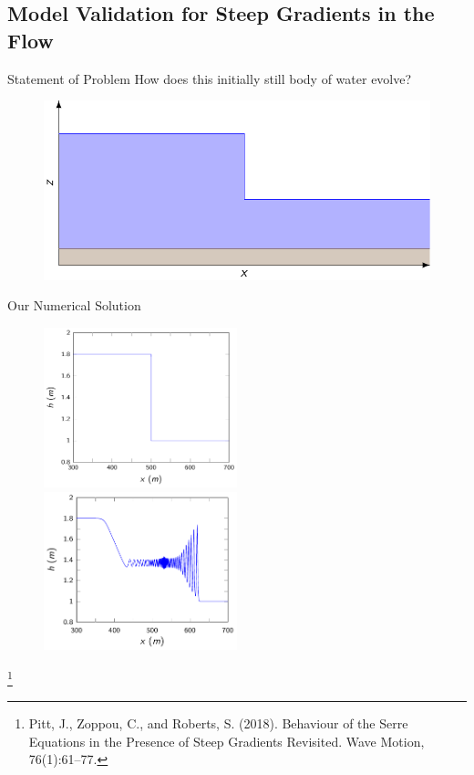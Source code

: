 \documentclass[pdf]{beamer}
\newcommand\blfootnote[1]{%
	\begingroup
	\renewcommand\thefootnote{}\footnote{#1}%
	\addtocounter{footnote}{-1}%
	\endgroup
}
\begin{document}
\subsection{ Model Validation for Steep Gradients in the Flow}
\begin{frame}{Statement of Problem}
	How does this initially still body of water evolve?
	\begin{figure}
		\includegraphics[width=\textwidth]{./Pics/SteepGradients/Wavetank.pdf}
	\end{figure}
\end{frame}	

\begin{frame}{Our Numerical Solution}
	\begin{figure}
		\includegraphics[width=0.5\textwidth]{./Pics/SteepGradients/DBinit.pdf}
		\includegraphics[width=0.5\textwidth]{./Pics/SteepGradients/DBfint.pdf}
	\end{figure}
	\blfootnote{Pitt, J., Zoppou, C., and Roberts, S. (2018).
		Behaviour of the Serre Equations in the Presence of Steep
		Gradients Revisited.
		Wave Motion, 76(1):61–77.}
\end{frame}
\end{document}
